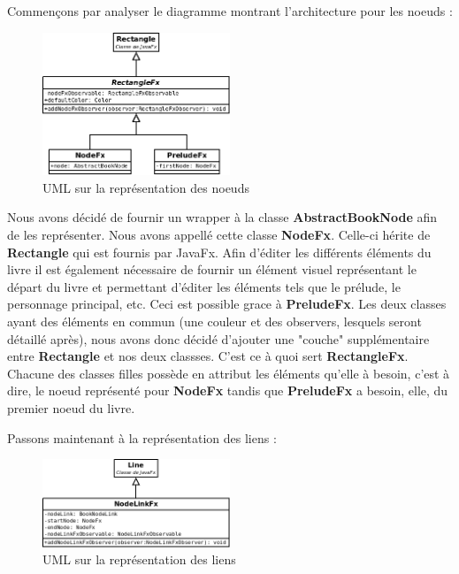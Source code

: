				Commençons par analyser le diagramme montrant l'architecture pour les noeuds :

				\begin{figure}[H]
					\centering\includegraphics[width=0.5\textwidth, keepaspectratio]{img/NodeFx.png}
					\caption{UML sur la représentation des noeuds}
				\end{figure}

				Nous avons décidé de fournir un wrapper à la classe \textbf{AbstractBookNode} afin de les représenter. Nous avons appellé cette classe \textbf{NodeFx}. Celle-ci hérite de \textbf{Rectangle} qui est fournis par JavaFx. Afin d'éditer les différents éléments du livre il est également nécessaire de fournir un élément visuel représentant le départ du livre et permettant d'éditer les éléments tels que le prélude, le personnage principal, etc. Ceci est possible grace à \textbf{PreludeFx}. Les deux classes ayant des éléments en commun (une couleur et des observers, lesquels seront détaillé après), nous avons donc décidé d'ajouter une "couche" supplémentaire entre \textbf{Rectangle} et nos deux classses. C'est ce à quoi sert \textbf{RectangleFx}. Chacune des classes filles possède en attribut les éléments qu'elle à besoin, c'est à dire, le noeud représenté pour \textbf{NodeFx} tandis que \textbf{PreludeFx} a besoin, elle, du premier noeud du livre.

				Passons maintenant à la représentation des liens :

				\begin{figure}[H]
					\centering\includegraphics[width=0.5\textwidth, keepaspectratio]{img/NodeLinkFx.png}
					\caption{UML sur la représentation des liens}
				\end{figure}

